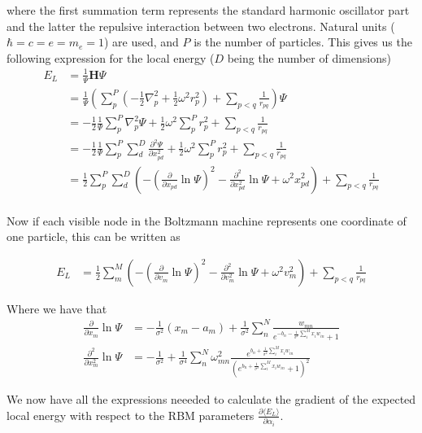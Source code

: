 \documentclass[twoside,english]{uiofysmaster}
\begin{document}
where the first summation term represents the standard harmonic oscillator part and the latter the repulsive interaction between two electrons. Natural units ($\hbar=c=e=m_e=1$) are used, and $P$ is the number of particles. This gives us the following expression for the local energy  ($D$ being the number of dimensions)
\begin{align}
	E_L &= \frac{1}{\Psi} \mathbf{H} \Psi \\
	&= \frac{1}{\Psi} (\sum_p^P (-\frac{1}{2}\nabla_p^2 + \frac{1}{2}\omega^2 r_p^2 ) + \sum_{p<q} \frac{1}{r_{pq}}) \Psi \\
	&= -\frac{1}{2}\frac{1}{\Psi} \sum_p^P \nabla_p^2 \Psi 
	+ \frac{1}{2}\omega^2 \sum_p^P  r_p^2  + \sum_{p<q} \frac{1}{r_{pq}} \\
	&= -\frac{1}{2}\frac{1}{\Psi} \sum_p^P \sum_d^D \frac{\partial^2 \Psi}{\partial x_{pd}^2} + \frac{1}{2}\omega^2 \sum_p^P  r_p^2  + \sum_{p<q} \frac{1}{r_{pq}} \\
	&= \frac{1}{2} \sum_p^P \sum_d^D (-(\frac{\partial}{\partial x_{pd}} \ln\Psi)^2 -\frac{\partial^2}{\partial x_{pd}^2} \ln\Psi + \omega^2 x_{pd}^2)  + \sum_{p<q} \frac{1}{r_{pq}} \\
\end{align}

Now if each visible node in the Boltzmann machine represents one coordinate of one particle, this can be written as

\begin{align}
	E_L &=
	\frac{1}{2} \sum_m^M (-(\frac{\partial}{\partial v_m} \ln\Psi)^2 -\frac{\partial^2}{\partial v_m^2} \ln\Psi + \omega^2 v_m^2)  + \sum_{p<q} \frac{1}{r_{pq}}
\end{align}

Where we have that
\begin{align}
	\frac{\partial}{\partial x_m} \ln\Psi
	&= - \frac{1}{\sigma^2}(x_m - a_m) + \frac{1}{\sigma^2} \sum_n^N \frac{w_{mn}}{e^{-b_n - \frac{1}{\sigma^2}\sum_i^M x_i w_{in}} + 1} \\
	\frac{\partial^2}{\partial x_m^2} \ln\Psi
	&= - \frac{1}{\sigma^2} + \frac{1}{\sigma^4}\sum_n^N \omega_{mn}^2 \frac{e^{b_n + \frac{1}{\sigma^2}\sum_i^M x_i w_{in}}}{(e^{b_n + \frac{1}{\sigma^2}\sum_i^M x_i w_{in}} + 1)^2}
\end{align}


We now have all the expressions neeeded to calculate the gradient of the expected local energy with respect to the RBM parameters $\frac{\partial \langle E_L \rangle}{\partial \alpha_i}$.
\end{document}
